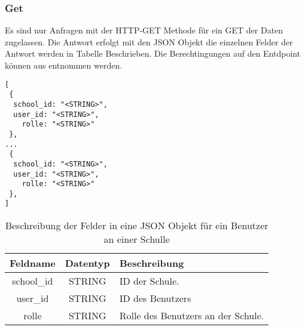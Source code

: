 \subsubsection{Get}
\label{sec:end:rest:api:school:users:get}
Es sind nur Anfragen mit der HTTP-GET Methode für ein GET der Daten zugelassen.
Die Antwort erfolgt mit den JSON Objekt  die einzelnen Felder der Antwort werden in Tabelle  Beschrieben.
Die Berechtingungen auf den Entdpoint können aus  entnommen werden.

\begin{lstlisting}[caption={JSON Antwort für ein GET aufruf der Route /api/school/users},label={lst:code:end:rest:api:school:users:get:ret},frame=tlrb]
[
 {
  school_id: "<STRING>",
  user_id: "<STRING>",
	rolle: "<STRING>"
 },
...
 {
  school_id: "<STRING>",
  user_id: "<STRING>",
	rolle: "<STRING>"
 },
]
\end{lstlisting}

\begin{table}[htb]
	\begin{tabularx}{\textwidth}{|c|c|X|}
		\hline
			\textbf{Feldname} & \textbf{Datentyp} & \textbf{Beschreibung} \\ \hline
			school\_id & STRING & ID der Schule. \\ \hline
			user\_id & STRING & ID des Benutzers \\ \hline
			rolle & STRING & Rolle des Benutzers an der Schule. \\ \hline
	\end{tabularx}

		\caption{Beschreibung der Felder in eine JSON Objekt für ein Benutzer an einer Schulle}
		\label{tab:end:rest:api:school:users:get:ret:json}
\end{table}

